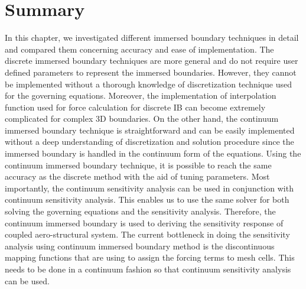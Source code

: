 \section{Summary}
In this chapter, we investigated different immersed boundary techniques in detail and compared them concerning accuracy and ease of implementation. The discrete immersed boundary techniques are more general and do not require user defined parameters to represent the immersed boundaries. However, they cannot be implemented without a thorough knowledge of discretization technique used for the governing equations. Moreover, the implementation of interpolation function used for force calculation for discrete IB can become extremely complicated for complex 3D boundaries. On the other hand, the continuum immersed boundary technique is straightforward and can be easily implemented without a deep understanding of discretization and solution procedure since the immersed boundary is handled in the continuum form of the equations. Using the continuum immersed boundary technique, it is possible to reach the same accuracy as the discrete method with the aid of tuning parameters. Most importantly, the continuum sensitivity analysis can be used in conjunction with continuum sensitivity analysis. This enables us to use the same solver for both solving the governing equations and the sensitivity analysis. Therefore, the continuum immersed boundary is used to deriving the sensitivity response of coupled aero-structural system. The current bottleneck in doing the sensitivity analysis using continuum immersed boundary method is the discontinuous mapping functions that are using to assign the forcing terms to mesh cells. This needs to be done in a continuum fashion so that continuum sensitivity analysis can be used.